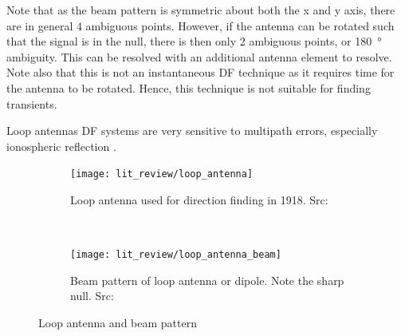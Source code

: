 Note that as the beam pattern is symmetric about both the x and y axis, there are in general 4 ambiguous points. However, if the antenna can be rotated such that the signal is in the null, there is then only 2 ambiguous points, or \SI{180}{\degree} ambiguity. This can be resolved with an  additional antenna element to resolve. Note also that this is not an instantaneous DF technique as it requires time for the antenna to be rotated. Hence, this technique is not suitable for finding transients. 

Loop antennas DF systems are very sensitive to multipath errors, especially ionospheric reflection \cite{jenkins1991smallaperture}. 
\begin{figure}
  \centering
  \begin{subfigure}[b]{0.48\textwidth}
    \centering
    \texttt{[image: lit\_review/loop\_antenna]}
    \caption{Loop antenna used for direction finding in 1918. Src: \cite{grabau1989funkpeiltechnik}}
  \end{subfigure}
  ~
  \begin{subfigure}[b]{0.48\textwidth}
    \centering
   \texttt{[image: lit\_review/loop\_antenna\_beam]}
   \caption{Beam pattern of loop antenna or dipole. Note the sharp null. Src: \cite{jenkins1991smallaperture}}
  \end{subfigure}
  \caption{Loop antenna and beam pattern}
  \label{fig:lit_loop_antenna}
\end{figure}

